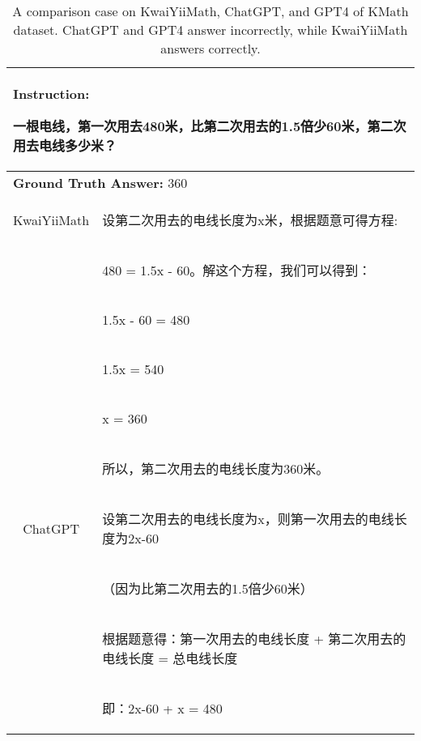 \documentclass{article}
\begin{document}
\begin{table}[h!]
\caption{A comparison case on KwaiYiiMath, ChatGPT, and GPT4 of KMath dataset. ChatGPT and GPT4 answer incorrectly, while KwaiYiiMath answers correctly.}
\begin{tabular}{ c|l } 
 \hline
 \multicolumn{2}{l}{\textbf{Instruction:} \begin{CJK*}{UTF8}{gbsn} 一根电线，第一次用去480米，比第二次用去的1.5倍少60米，第二次用去电线多少米？\end{CJK*}} \\
 \hline
 \multicolumn{2}{l}{\textbf{Ground Truth Answer:} 360} \\
 \hline
 KwaiYiiMath & \begin{CJK*}{UTF8}{gbsn} 设第二次用去的电线长度为x米，根据题意可得方程: \end{CJK*}\\
             & \begin{CJK*}{UTF8}{gbsn} 480 = 1.5x - 60。解这个方程，我们可以得到：\end{CJK*}\\
             & \begin{CJK*}{UTF8}{gbsn} 1.5x - 60 = 480 \end{CJK*}\\
             & \begin{CJK*}{UTF8}{gbsn} 1.5x = 540 \end{CJK*}\\
             & \begin{CJK*}{UTF8}{gbsn} x = 360 \end{CJK*}\\
             & \begin{CJK*}{UTF8}{gbsn} 所以，第二次用去的电线长度为360米。 \end{CJK*}\\
  \hline
  ChatGPT & \begin{CJK*}{UTF8}{gbsn} 设第二次用去的电线长度为x，则第一次用去的电线长度为2x-60 \end{CJK*}\\
             & \begin{CJK*}{UTF8}{gbsn} （因为比第二次用去的1.5倍少60米） \end{CJK*}\\
             & \begin{CJK*}{UTF8}{gbsn} 根据题意得：第一次用去的电线长度 + 第二次用去的电线长度 = 总电线长度 \end{CJK*}\\
             & \begin{CJK*}{UTF8}{gbsn} 即：2x-60 + x = 480 \end{CJK*}\\

\end{tabular}
\end{table}
\end{document}
